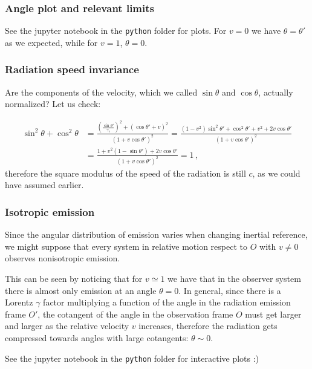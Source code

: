 \documentclass[main.tex]{subfiles}
\begin{document}
\subsubsection{Angle plot and relevant limits}
See the jupyter notebook in the \texttt{python} folder for plots.
For $v=0$ we have $\theta=\theta'$ as we expected, while for $v=1$, $\theta = 0$.

\subsubsection{Radiation speed invariance}

Are the components of the velocity, which we called \(\sin \theta\) and \(\cos \theta \), actually normalized? Let us check:

\begin{subequations}
\begin{align}
    \sin^2\theta + \cos^2\theta &= \frac{(\frac{\sin\theta'}{\gamma_v})^2 + (\cos\theta' + v)^2}{(1 + v\cos\theta')^2} = \frac{(1-v^2)\sin^2\theta' + \cos^2\theta' + v^2 + 2v\cos\theta'}{(1 + v\cos\theta')^2} \\
    &= \frac{1+v^2(1-\sin\theta')+2v\cos\theta'}{(1 + v\cos\theta')^2} = 1 \,,
\end{align}
\end{subequations}
%
therefore the square modulus of the speed of the radiation is still \(c\), as we could have assumed earlier.

\subsubsection{Isotropic emission}

Since the angular distribution of emission varies when changing inertial reference, we might suppose that every system in relative motion respect to $O$ with $v\neq 0$ observes nonisotropic emission.

This can be seen by noticing that for $v\simeq 1$ we have that in the observer system there is almost only emission at an angle $\theta = 0$.
In general, since there is a Lorentz \(\gamma\) factor multiplying a function of the angle in the radiation emission frame \(O'\), the cotangent of the angle in the observation frame \(O\) must get larger and larger as the relative velocity \(v\) increases, therefore the radiation gets compressed towards angles with large cotangents: \(\theta\sim 0\). 

See the jupyter notebook in the \texttt{python} folder for interactive plots :)
\end{document}
